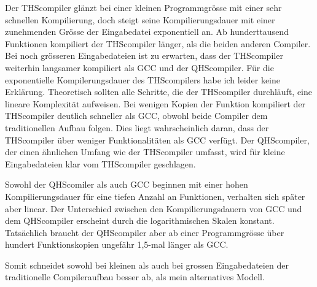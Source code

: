 Der THScompiler glänzt bei einer kleinen Programmgrösse mit einer sehr schnellen Kompilierung, doch steigt seine Kompilierungsdauer mit einer zunehmenden Grösse der Eingabedatei exponentiell an.
Ab hunderttausend Funktionen kompiliert der THScompiler länger, als die beiden anderen Compiler.
Bei noch grösseren Eingabedateien ist zu erwarten, dass der THScompiler weiterhin langsamer kompiliert als GCC und der QHScompiler.
Für die exponentielle Kompilerungsdauer des THScompilers habe ich leider keine Erklärung. Theoretisch sollten alle Schritte, die der THScompiler durchläuft, eine lineare Komplexität aufweisen.
Bei wenigen Kopien der Funktion kompiliert der THScompiler deutlich schneller als GCC, obwohl beide Compiler dem traditionellen Aufbau folgen.
Dies liegt wahrscheinlich daran, dass der THScompiler über weniger Funktionalitäten als GCC verfügt.
Der QHScompiler, der einen ähnlichen Umfang wie der THScompiler umfasst, wird für kleine Eingabedateien klar vom THScompiler geschlagen.

Sowohl der QHScomiler als auch GCC beginnen mit einer hohen Kompilierungsdauer für eine tiefen Anzahl an Funktionen, verhalten sich später aber linear.
Der Unterschied zwischen den Kompilierungsdauern von GCC und dem QHScompiler erscheint durch die logarithmischen Skalen konstant.
Tatsächlich braucht der QHScompiler aber ab einer Programmgrösse über hundert Funktionskopien ungefähr 1,5-mal länger als GCC. 

Somit schneidet sowohl bei kleinen als auch bei grossen Eingabedateien der traditionelle Compileraufbau besser ab, als mein alternatives Modell.


